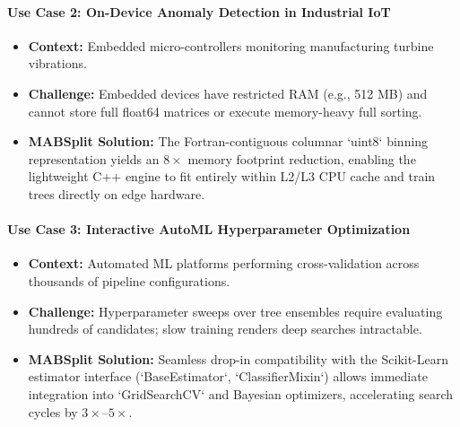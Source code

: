 \documentclass{article}
\begin{document}
	\paragraph{Use Case 2: On-Device Anomaly Detection in Industrial IoT}
	\begin{itemize}
		\item \textbf{Context:} Embedded micro-controllers monitoring manufacturing turbine vibrations.
		\item \textbf{Challenge:} Embedded devices have restricted RAM (e.g., 512 MB) and cannot store full float64 matrices or execute memory-heavy full sorting.
		\item \textbf{MABSplit Solution:} The Fortran-contiguous columnar `uint8` binning representation yields an $8\times$ memory footprint reduction, enabling the lightweight C++ engine to fit entirely within L2/L3 CPU cache and train trees directly on edge hardware.
	\end{itemize}

	\paragraph{Use Case 3: Interactive AutoML Hyperparameter Optimization}
	\begin{itemize}
		\item \textbf{Context:} Automated ML platforms performing cross-validation across thousands of pipeline configurations.
		\item \textbf{Challenge:} Hyperparameter sweeps over tree ensembles require evaluating hundreds of candidates; slow training renders deep searches intractable.
		\item \textbf{MABSplit Solution:} Seamless drop-in compatibility with the Scikit-Learn estimator interface (`BaseEstimator`, `ClassifierMixin`) allows immediate integration into `GridSearchCV` and Bayesian optimizers, accelerating search cycles by $3\times\text{--}5\times$.
	\end{itemize}

	\pagebreak
	
\end{document}

